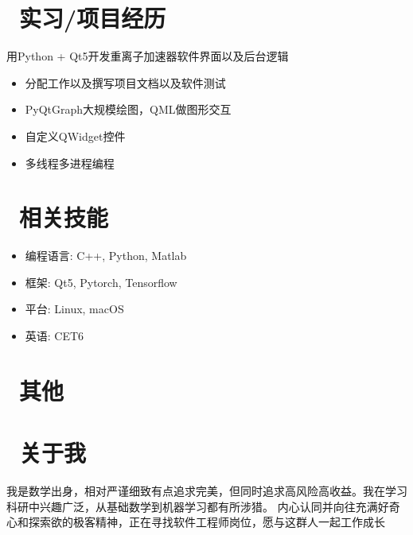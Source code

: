 \documentclass{resume}
\begin{document}
\section{\faUsers\ 实习/项目经历}
\begin{onehalfspacing}
用Python + Qt5开发重离子加速器软件界面以及后台逻辑
\begin{itemize}
  \item 分配工作以及撰写项目文档以及软件测试
  \item PyQtGraph大规模绘图，QML做图形交互
  \item 自定义QWidget控件
  \item 多线程多进程编程
\end{itemize}
\end{onehalfspacing}


\section{\faCogs\ 相关技能}
\vspace{-1\baselineskip}
\begin{multicols}{2}
\begin{itemize}[parsep=0.5ex]
    \item 编程语言: C++, Python, Matlab
    \item 框架: Qt5, Pytorch, Tensorflow
    \item 平台: Linux, macOS
    \item 英语: CET6
\end{itemize}
\end{multicols}

\section{\faInfo\ 其他}

\section{\faGamepad\ 关于我}
我是数学出身，相对严谨细致有点追求完美，但同时追求高风险高收益。我在学习科研中兴趣广泛，从基础数学到机器学习都有所涉猎。
内心认同并向往充满好奇心和探索欲的极客精神，正在寻找软件工程师岗位，愿与这群人一起工作成长

%
%
\end{document}
